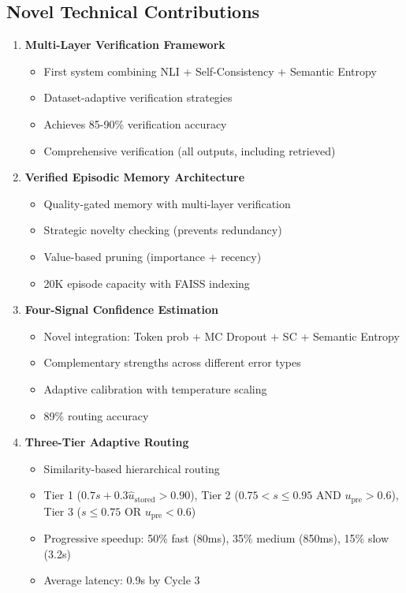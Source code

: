 \documentclass[12pt,a4paper]{article}
\theoremstyle{definition}
\newcommand{\upre}{u_{\text{pre}}}
\newcommand{\ustored}{\hat{u}_{\text{stored}}}
\begin{document}
\subsection{Novel Technical Contributions}

\begin{enumerate}
    \item \textbf{Multi-Layer Verification Framework}
    \begin{itemize}
        \item First system combining NLI + Self-Consistency + Semantic Entropy
        \item Dataset-adaptive verification strategies
        \item Achieves 85-90\% verification accuracy
        \item Comprehensive verification (all outputs, including retrieved)
    \end{itemize}
    
    \item \textbf{Verified Episodic Memory Architecture}
    \begin{itemize}
        \item Quality-gated memory with multi-layer verification
        \item Strategic novelty checking (prevents redundancy)
        \item Value-based pruning (importance + recency)
        \item 20K episode capacity with FAISS indexing
    \end{itemize}
    
    \item \textbf{Four-Signal Confidence Estimation}
    \begin{itemize}
        \item Novel integration: Token prob + MC Dropout + SC + Semantic Entropy
        \item Complementary strengths across different error types
        \item Adaptive calibration with temperature scaling
        \item 89\% routing accuracy
    \end{itemize}
    
    \item \textbf{Three-Tier Adaptive Routing}
    \begin{itemize}
        \item Similarity-based hierarchical routing
        \item Tier 1 ($0.7s{+}0.3\ustored{>}0.90$), Tier 2 ($0.75{<}s{\leq}0.95$ AND $\upre{>}0.6$), Tier 3 ($s{\leq}0.75$ OR $\upre{<}0.6$)
        \item Progressive speedup: 50\% fast (80ms), 35\% medium (850ms), 15\% slow (3.2s)
        \item Average latency: 0.9s by Cycle 3
    \end{itemize}
    

\end{enumerate}
\end{document}
